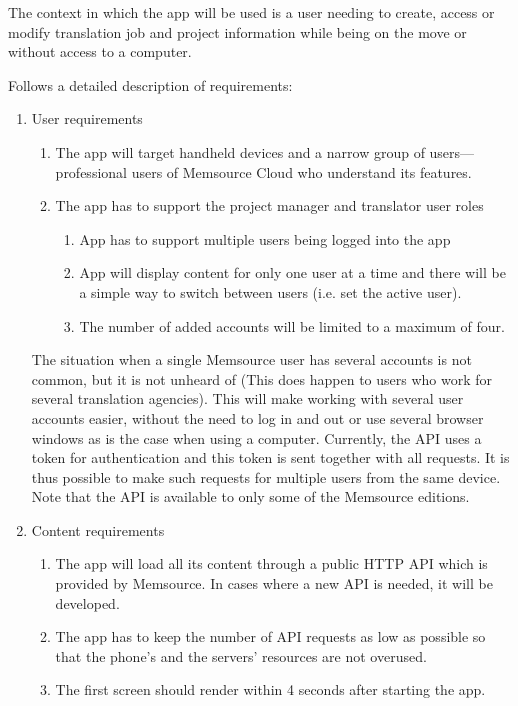 The context in which the app will be used is a user needing to create, access or modify translation job and project information while being on the move or without access to a computer.

Follows a detailed description of requirements:


\begin{enumerate}
	\item User requirements
	\begin{enumerate}[label*=\arabic*.]
		\item The app will target handheld devices and a narrow group of users---professional users of Memsource Cloud who understand its features. 
		\item The app has to support the project manager and translator user roles 
		\begin{enumerate}[label*=\arabic*.]
			\item App has to support multiple users being logged into the app
			\item App will display content for only one user at a time and there will be a simple way to switch between users (i.e. set the active user).
			\item The number of added accounts will be limited to a maximum of four.
		\end{enumerate}
	\end{enumerate}
	
	The situation when a single Memsource user has several accounts is not common, but it is not unheard of (This does happen to users who work for several translation agencies). This will make working with several user accounts easier, without the need to log in and out or use several browser windows as is the case when using a computer. Currently, the API uses a token for authentication and this token is sent together with all requests. It is thus possible to make such requests for multiple users from the same device. Note that the API is available to only some of the Memsource editions.  
	
	\item Content requirements
	\begin{enumerate}[label*=\arabic*.]
		\item The app will load all its content through a public HTTP API which is provided by Memsource. In cases where a new API is needed, it will be developed.
		\item The app has to keep the number of API requests as low as possible so that the phone's and the servers' resources are not overused.
		\item The first screen should render within 4 seconds after starting the app.
	\end{enumerate}
	

\end{enumerate}
